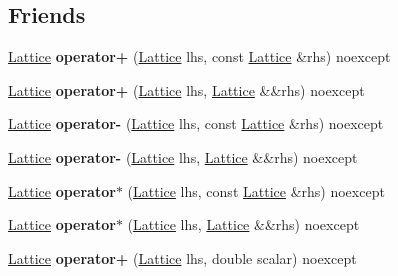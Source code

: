 \subsection*{Friends}
\begin{DoxyCompactItemize}
\item 
\hyperlink{classLattice}{Lattice} {\bfseries operator+} (\hyperlink{classLattice}{Lattice} lhs, const \hyperlink{classLattice}{Lattice} \&rhs) noexcept\hypertarget{classLattice_ac28ada33e384adc96b54ab5a00f1ec28}{}\label{classLattice_ac28ada33e384adc96b54ab5a00f1ec28}

\item 
\hyperlink{classLattice}{Lattice} {\bfseries operator+} (\hyperlink{classLattice}{Lattice} lhs, \hyperlink{classLattice}{Lattice} \&\&rhs) noexcept\hypertarget{classLattice_aea2fc2f07be3e5ecf1279cb462f79be5}{}\label{classLattice_aea2fc2f07be3e5ecf1279cb462f79be5}

\item 
\hyperlink{classLattice}{Lattice} {\bfseries operator-\/} (\hyperlink{classLattice}{Lattice} lhs, const \hyperlink{classLattice}{Lattice} \&rhs) noexcept\hypertarget{classLattice_a6bba9a42a389191a51c6422ef3afafb9}{}\label{classLattice_a6bba9a42a389191a51c6422ef3afafb9}

\item 
\hyperlink{classLattice}{Lattice} {\bfseries operator-\/} (\hyperlink{classLattice}{Lattice} lhs, \hyperlink{classLattice}{Lattice} \&\&rhs) noexcept\hypertarget{classLattice_a71f1ed091e19960d9a0b83f9f6256601}{}\label{classLattice_a71f1ed091e19960d9a0b83f9f6256601}

\item 
\hyperlink{classLattice}{Lattice} {\bfseries operator$\ast$} (\hyperlink{classLattice}{Lattice} lhs, const \hyperlink{classLattice}{Lattice} \&rhs) noexcept\hypertarget{classLattice_a3b197d5957c3cf21def6b7ee67b011a1}{}\label{classLattice_a3b197d5957c3cf21def6b7ee67b011a1}

\item 
\hyperlink{classLattice}{Lattice} {\bfseries operator$\ast$} (\hyperlink{classLattice}{Lattice} lhs, \hyperlink{classLattice}{Lattice} \&\&rhs) noexcept\hypertarget{classLattice_a9d512d9137f64afbe70b4e1444e6cbb8}{}\label{classLattice_a9d512d9137f64afbe70b4e1444e6cbb8}

\item 
\hyperlink{classLattice}{Lattice} {\bfseries operator+} (\hyperlink{classLattice}{Lattice} lhs, double scalar) noexcept\hypertarget{classLattice_a18ff73c1321be8c5e5386059d4520051}{}\label{classLattice_a18ff73c1321be8c5e5386059d4520051}


\end{DoxyCompactItemize}
